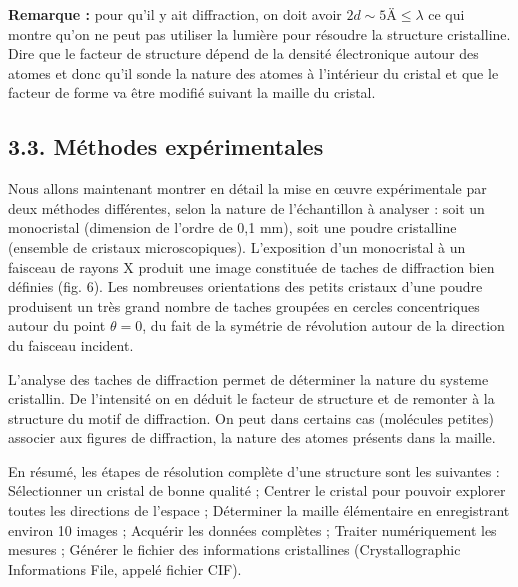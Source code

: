 \documentclass[french, a4paper, 10pt, twocolumn, landscape]{article}
\begin{document}
\textbf{Remarque :} pour qu'il y ait diffraction, on doit avoir $2d\sim 5 Ä\leq\lambda$ ce qui montre qu'on ne peut pas utiliser la lumière pour résoudre la structure cristalline.\\

Dire que le facteur de structure dépend de la densité électronique autour des atomes et donc qu'il sonde la nature des atomes à l'intérieur du cristal et que le facteur de forme va être modifié suivant la maille du cristal.

\subsection*{3.3. Méthodes expérimentales}

Nous allons maintenant montrer en détail la mise en œuvre expérimentale par deux méthodes différentes, selon la nature de l'échantillon à analyser : soit un monocristal (dimension de l'ordre de 0,1 mm), soit une poudre cristalline (ensemble de cristaux microscopiques). L'exposition d'un monocristal à un faisceau de rayons X produit une image constituée de taches de diffraction bien définies (fig. 6). Les nombreuses orientations des petits cristaux d'une poudre produisent un très grand nombre de taches groupées en cercles concentriques autour du point $\theta = 0$, du fait de la symétrie de révolution autour de la direction du faisceau incident. \medskip

L'analyse des taches de diffraction permet de déterminer la nature du systeme cristallin. De l'intensité on en déduit le facteur de structure et de remonter à la structure du motif de diffraction.  On peut dans certains cas (molécules petites) associer aux figures de diffraction, la nature des atomes présents dans la maille.

En résumé, les étapes de résolution complète d'une structure sont les suivantes :
Sélectionner un cristal de bonne qualité ;
Centrer le cristal pour pouvoir explorer toutes les directions de l'espace ;
Déterminer la maille élémentaire en enregistrant environ 10 images ;
Acquérir les données complètes ;
Traiter numériquement les mesures ;
Générer le fichier des informations cristallines (Crystallographic Informations File, appelé fichier CIF).
\end{document}
